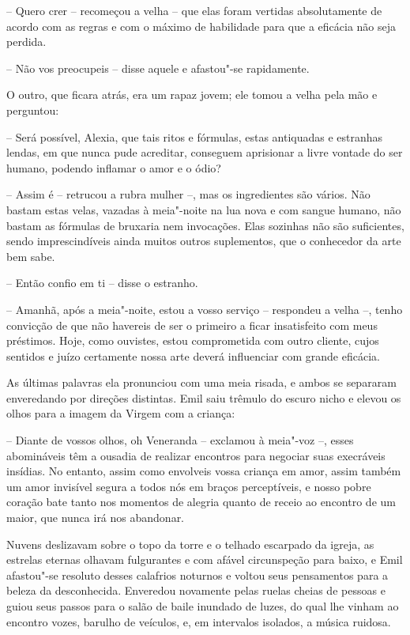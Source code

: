 -- Quero crer -- recomeçou a velha -- que elas foram vertidas
absolutamente de acordo com as regras e com o máximo de habilidade para
que a eficácia não seja perdida.

-- Não vos preocupeis -- disse aquele e afastou"-se rapidamente.

O outro, que ficara atrás, era um rapaz jovem; ele tomou a velha pela
mão e perguntou:

-- Será possível, Alexia, que tais ritos e fórmulas, estas
antiquadas e estranhas lendas, em que nunca pude acreditar, conseguem
aprisionar a livre vontade do ser humano, podendo inflamar o amor e o ódio?

-- Assim é -- retrucou a rubra mulher --, mas os ingredientes são
vários. Não bastam estas velas, vazadas à meia"-noite na lua nova e com
sangue humano, não bastam as fórmulas de bruxaria nem invocações. Elas
sozinhas não são suficientes, sendo  imprescindíveis ainda muitos
outros suplementos, que o conhecedor da arte bem sabe.

-- Então confio em ti -- disse o estranho. 

-- Amanhã, após a meia"-noite, estou a vosso serviço -- respondeu a
velha --, tenho convicção de que não havereis de ser o primeiro a ficar
insatisfeito com meus préstimos. Hoje, como ouvistes, estou
comprometida com outro cliente, cujos sentidos e juízo certamente nossa
arte deverá influenciar com grande eficácia.

As últimas palavras ela pronunciou com uma meia risada, e ambos se
separaram enveredando por direções distintas. Emil saiu trêmulo do
escuro nicho e elevou os olhos para a imagem da Virgem com a criança:

-- Diante de vossos olhos, oh Veneranda -- exclamou à meia"-voz --, esses
abomináveis têm a ousadia de realizar encontros para negociar suas
execráveis insídias. No entanto, assim como envolveis vossa criança em
amor, assim também um amor invisível segura a todos nós em braços
perceptíveis, e nosso pobre coração bate tanto nos momentos de alegria
quanto de receio ao encontro de um maior, que nunca irá nos abandonar.

Nuvens deslizavam sobre o topo da torre e o telhado escarpado da igreja,
as estrelas eternas olhavam fulgurantes e com afável circunspeção para
baixo, e Emil afastou"-se resoluto desses calafrios noturnos e voltou
seus pensamentos para a beleza da desconhecida. Enveredou novamente
pelas ruelas cheias de pessoas e guiou seus passos para o salão de
baile inundado de luzes, do qual lhe vinham ao encontro vozes, barulho
de veículos, e, em intervalos isolados, a música ruidosa.

